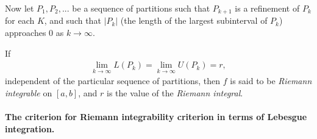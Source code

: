 \documentclass{article} %
\begin{document}
Now let $P_1, P_2, ...$ be a sequence of partitions such that $P_{k+1}$ is a refinement of $P_k$ for each $K$, and such that $|P_k|$ (the length of the largest subinterval of $P_k$) approaches 0 as $k \to \infty$.  

If 
\begin{align}
 \lim_{k \to \infty} L(P_k) =  \lim_{k \to \infty} U(P_k) = r,
 \label{eqn:criterion_for_riemann_integrability}	
\end{align}
 independent of the particular sequence of partitions, then $f$ is said to be \textit{Riemann integrable} on $[a,b]$, and $r$ is the value of the \textit{Riemann integral}. 

\paragraph{The criterion for Riemann integrability criterion in terms of Lebesgue integration.}
\end{document}
